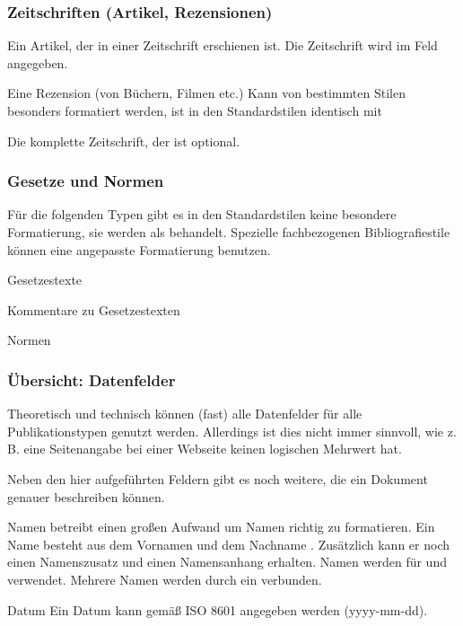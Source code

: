 \subsubsection{Zeitschriften (Artikel, Rezensionen)}

\begin{labeling}{}
\item[\meta{@article}]    Ein Artikel, der in einer Zeitschrift erschienen ist.
        Die Zeitschrift wird im Feld  angegeben.
\item[\meta{@review}]     Eine Rezension (von Büchern, Filmen etc.)
        Kann von bestimmten Stilen besonders formatiert werden, 
        ist in den Standardstilen identisch mit 
\item[\meta{@periodical}] Die komplette Zeitschrift, der  ist optional.
\end{labeling}

\subsubsection{Gesetze und Normen}

Für die folgenden Typen gibt es in den Standardstilen keine besondere Formatierung,
sie werden als  behandelt.
Spezielle fachbezogenen Bibliografiestile können eine angepasste Formatierung benutzen.

\begin{labeling}{}
\item[\meta{@legislation}]      Gesetzestexte
\item[\meta{@commentary}]       Kommentare zu Gesetzestexten
\item[\meta{@standard}]         Normen
\end{labeling}

\subsubsection{Übersicht: Datenfelder}
Theoretisch und technisch können (fast) alle Datenfelder für alle Publikationstypen genutzt werden.
Allerdings ist dies nicht immer sinnvoll, wie z.\,B. eine Seitenangabe bei einer Webseite keinen logischen Mehrwert hat.

Neben den hier aufgeführten Feldern gibt es noch weitere, die ein Dokument
genauer beschreiben können.

\begin{labeling}{}
\item[Namen]     betreibt einen großen Aufwand um Namen richtig zu formatieren.
        Ein Name besteht aus dem Vornamen  und dem Nachname .
        Zusätzlich kann er noch einen Namenszusatz  und einen Namensanhang  erhalten.
        Namen werden für  und  verwendet.
        Mehrere Namen werden durch ein  verbunden.
\item[Datum] Ein Datum kann gemäß ISO 8601 angegeben werden (yyyy-mm-dd). 
\end{labeling}

